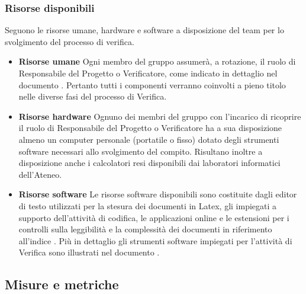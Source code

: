 		\subsubsection{Risorse disponibili}
		Seguono le risorse umane, hardware e software a disposizione del team per lo svolgimento del processo di verifica.
		\begin{itemize}
			\item \textbf{Risorse umane}
			Ogni membro del gruppo assumerà, a rotazione, il ruolo di Responsabile del Progetto o Verificatore, come indicato in dettaglio nel documento \PdP. Pertanto tutti i componenti verranno coinvolti a pieno titolo nelle diverse fasi del processo di Verifica.
			\item \textbf{Risorse hardware}
			Ognuno dei membri del gruppo con l'incarico di ricoprire il ruolo di Responsabile del Progetto o Verificatore ha a sua disposizione almeno un computer personale (portatile o fisso) dotato degli strumenti software necessari allo svolgimento del compito. Risultano inoltre a disposizione anche i calcolatori resi disponibili dai laboratori informatici dell'Ateneo.
			\item \textbf{Risorse software}
			Le risorse software disponibili sono costituite dagli editor di testo utilizzati per la stesura dei documenti in Latex, gli  impiegati a supporto dell'attività di codifica, le applicazioni online e le estensioni per i controlli sulla leggibilità e la complessità dei documenti in riferimento all'indice . Più in dettaglio gli strumenti software impiegati per l'attività di Verifica sono illustrati nel documento \NdP.
			\end{itemize}
	\subsection{Misure e metriche \label{S5}}
